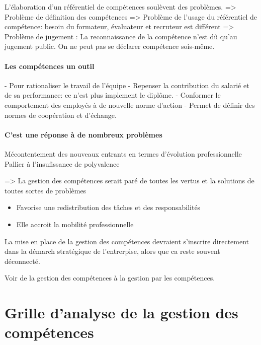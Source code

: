L'élaboration d'un référentiel de compétences soulèvent des problèmes. 
=> Problème de définition des compétences 
=> Problème de l'usage du référentiel de compétence: besoin du formateur, évaluateur et recruteur est différent
=> Problème de jugement : La reconnaissance de la compétence n'est dû qu'au jugement public. On ne peut pas se déclarer compétence sois-même. 



\paragraph{Les compétences un outil}
- Pour rationaliser le travail de l'équipe
- Repenser la contribution du salarié et de sa performance: ce n'est plus implement le diplôme. 
- Conformer le comportement des employés à de nouvelle norme d'action 
- Permet de définir des normes de coopération et d'échange. 

\paragraph{C'est une réponse à de nombreux problèmes}
Mécontentement des nouveaux entrants en termes d'évolution professionnelle
Pallier à l'insufissance de polyvalence

=> La gestion des compétences serait paré de toutes les vertus et la solutions de toutes sortes de problèmes

\begin{itemize}
    \item Favorise une redistribution des tâches et des responsabilités
    \item Elle accroit la mobilité professionnelle
\end{itemize}




La mise en place de la gestion des compétences devraient s'inscrire directement dans la démarch stratégique de l'entrerpise, alors que ca reste souvent déconnecté. 

Voir de la gestion des compétences à la gestion par les compétences. 


\section{Grille d'analyse de la gestion des compétences}

